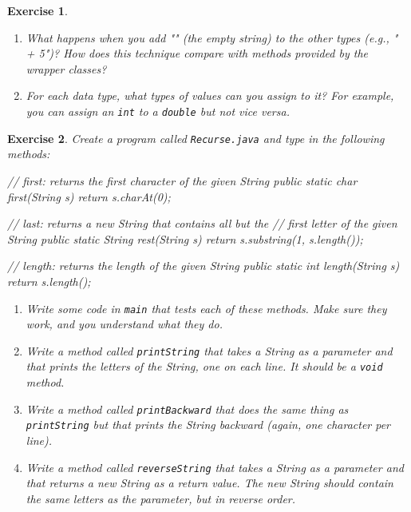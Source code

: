 \documentclass[12pt]{book}
\theoremstyle{exercise}
\newtheorem{exercise}{Exercise}[chapter]
\newcommand{\java}[1]{\verb"#1"}
\newcommand{\java}[1]{\lstinline{#1}} %
\begin{document}
\begin{exercise}
\begin{enumerate}
\item What happens when you add \java{""} (the empty string) to the other types (e.g., \java{"" + 5})?
How does this technique compare with methods provided by the wrapper classes?

\item For each data type, what types of values can you assign to it? For example, you can assign an \java{int} to a \java{double} but not vice versa.

\end{enumerate}

\end{exercise}


\begin{exercise}

Create a program called {\tt Recurse.java} and type in the following methods:

\begin{code}
    // first: returns the first character of the given String
    public static char first(String s) {
        return s.charAt(0);
    }

    // last: returns a new String that contains all but the
    // first letter of the given String
    public static String rest(String s) {
        return s.substring(1, s.length());
    }

    // length: returns the length of the given String
    public static int length(String s) {
        return s.length();
    }
\end{code}

\begin{enumerate}

\item Write some code in \java{main} that tests each of these methods.
Make sure they work, and you understand what they do.

\item Write a method called \java{printString} that takes a String as a parameter and that prints the letters of the String, one on each line.  It should be a \java{void} method.

\item Write a method called \java{printBackward} that does the same thing as \java{printString} but that prints the String backward (again, one character per line).

\item Write a method called \java{reverseString} that takes a String as a parameter and that returns a new String as a return value.
The new String should contain the same letters as the parameter, but in reverse order.


\end{enumerate}
\end{exercise}
\end{document}
